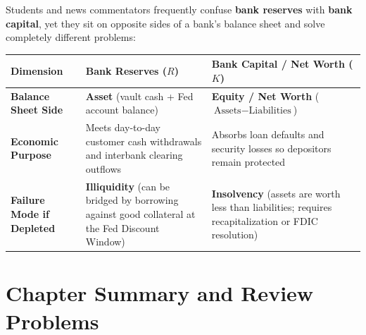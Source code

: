 \documentclass[11pt, oneside]{book}
\begin{document}
\begin{clearitup}
Students and news commentators frequently confuse \textbf{bank reserves} with \textbf{bank capital}, yet they sit on opposite sides of a bank's balance sheet and solve completely different problems:
\begin{center}
\begin{tabular}{p{3.1cm}p{5.5cm}p{5.5cm}}
\toprule
\textbf{Dimension} & \textbf{Bank Reserves ($R$)} & \textbf{Bank Capital / Net Worth ($K$)} \\
\midrule
\textbf{Balance Sheet Side} & \textbf{Asset} (vault cash + Fed account balance) & \textbf{Equity / Net Worth} ($\text{Assets} - \text{Liabilities}$) \\
\textbf{Economic Purpose} & Meets day-to-day customer cash withdrawals and interbank clearing outflows & Absorbs loan defaults and security losses so depositors remain protected \\
\textbf{Failure Mode if Depleted} & \textbf{Illiquidity} (can be bridged by borrowing against good collateral at the Fed Discount Window) & \textbf{Insolvency} (assets are worth less than liabilities; requires recapitalization or FDIC resolution) \\
\bottomrule
\end{tabular}
\end{center}
\end{clearitup}

\section{Chapter Summary and Review Problems}
\end{document}
